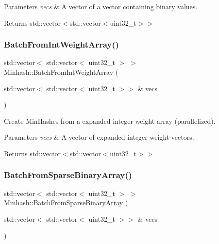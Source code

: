 \begin{DoxyParams}{Parameters}
{\em vecs} & A vector of a vector containing binary values. \\
\hline
\end{DoxyParams}
\begin{DoxyReturn}{Returns}
std\+::vector$<$std\+::vector$<$uint32\+\_\+t$>$$>$ 
\end{DoxyReturn}
\mbox{\label{classMinhash_a6d468d2ee939351ffed9ea3ff8d82643}} 
\subsubsection{\texorpdfstring{Batch\+From\+Int\+Weight\+Array()}{BatchFromIntWeightArray()}}
{\footnotesize\ttfamily std\+::vector$<$ std\+::vector$<$ uint32\+\_\+t $>$ $>$ Minhash\+::\+Batch\+From\+Int\+Weight\+Array (\begin{DoxyParamCaption}\item[{std\+::vector$<$ std\+::vector$<$ uint32\+\_\+t $>$$>$ \&}]{vecs }\end{DoxyParamCaption})}



Create Min\+Hashes from a expanded integer weight array (parallelized). 


\begin{DoxyParams}{Parameters}
{\em vecs} & A vector of expanded integer weight vectors. \\
\hline
\end{DoxyParams}
\begin{DoxyReturn}{Returns}
std\+::vector$<$std\+::vector$<$uint32\+\_\+t$>$$>$ 
\end{DoxyReturn}
\mbox{\label{classMinhash_a8f711d80f1cb52f0599927667b123739}} 
\subsubsection{\texorpdfstring{Batch\+From\+Sparse\+Binary\+Array()}{BatchFromSparseBinaryArray()}}
{\footnotesize\ttfamily std\+::vector$<$ std\+::vector$<$ uint32\+\_\+t $>$ $>$ Minhash\+::\+Batch\+From\+Sparse\+Binary\+Array (\begin{DoxyParamCaption}\item[{std\+::vector$<$ std\+::vector$<$ uint32\+\_\+t $>$$>$ \&}]{vecs }\end{DoxyParamCaption})}



